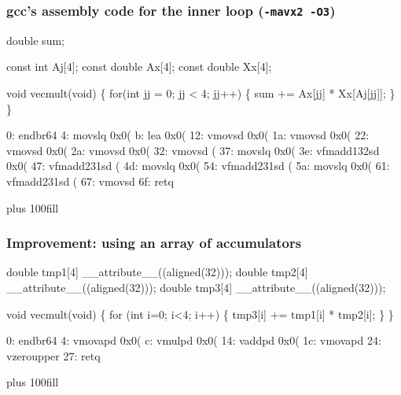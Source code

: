 \documentclass{beamer}
\begin{document}
\begin{frame}[fragile]
\frametitle{gcc's assembly code for the inner loop ({\tt -mavx2 -O3})}
\begin{semiverbatim}
\tiny
double sum;

const int Aj[4];
const double Ax[4];
const double Xx[4];

void vecmult(void)
\{
    for(int jj = 0; jj < 4; jj++) \{
        sum += Ax[jj] * Xx[Aj[jj]];
    \}
\}

0:   endbr64
4:   movslq       0x0(%
b:   lea          0x0(%
12:  vmovsd       0x0(%
1a:  vmovsd       0x0(%
22:  vmovsd       0x0(%
2a:  vmovsd       0x0(%
32:  vmovsd       (%
37:  movslq       0x0(%
3e:  vfmadd132sd  0x0(%
47:  vfmadd231sd  (%
4d:  movslq       0x0(%
54:  vfmadd231sd  (%
5a:  movslq       0x0(%
61:  vfmadd231sd  (%
67:  vmovsd       %
6f:  retq

\end{semiverbatim}
\vskip 0pt plus 100fill
\end{frame}

\begin{frame}[fragile]
\frametitle{Improvement: using an array of accumulators}
\begin{semiverbatim}
\scriptsize

double tmp1[4] __attribute__((aligned(32)));
double tmp2[4] __attribute__((aligned(32)));
double tmp3[4] __attribute__((aligned(32)));

void vecmult(void)
\{
    for (int i=0; i<4; i++) \{
        tmp3[i] += tmp1[i] * tmp2[i];
    \}
\}

0:   endbr64
4:   vmovapd     0x0(%
c:   vmulpd      0x0(%
14:  vaddpd      0x0(%
1c:  vmovapd     %
24:  vzeroupper
27:  retq

\end{semiverbatim}
\vskip 0pt plus 100fill
\end{frame}
\end{document}
